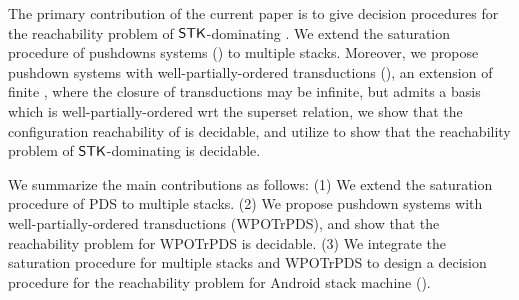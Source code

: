 The primary contribution of the current paper is to give decision procedures for the reachability problem of $\mathsf{STK}$-dominating {\AMASS}. We extend the saturation procedure of pushdowns systems (\PDS) to multiple stacks.  Moreover, we propose pushdown systems with well-partially-ordered transductions (\WOTrPDS), an extension of finite \TrPDS, where the closure of transductions may be infinite, but admits a basis which is well-partially-ordered wrt the superset relation, we show that the configuration reachability of \WOTrPDS is decidable, and utilize \WOTrPDS to show that the reachability problem of $\mathsf{STK}$-dominating {\AMASS} is decidable.

We summarize the main contributions as follows: (1) We extend the saturation procedure of PDS to multiple stacks. (2) We propose pushdown systems with well-partially-ordered transductions (WPOTrPDS), and show that the reachability problem for WPOTrPDS is decidable.
%	
%	
%
    (3) We integrate the saturation procedure for multiple stacks and WPOTrPDS to design a decision procedure for the reachability problem for Android stack machine ({\AMASS}). 
	
